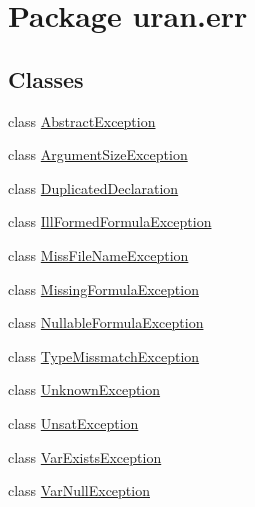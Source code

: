 \hypertarget{namespaceuran_1_1err}{}\section{Package uran.\+err}
\label{namespaceuran_1_1err}
\subsection*{Classes}
\begin{DoxyCompactItemize}
\item 
class \hyperlink{classuran_1_1err_1_1_abstract_exception}{Abstract\+Exception}
\item 
class \hyperlink{classuran_1_1err_1_1_argument_size_exception}{Argument\+Size\+Exception}
\item 
class \hyperlink{classuran_1_1err_1_1_duplicated_declaration}{Duplicated\+Declaration}
\item 
class \hyperlink{classuran_1_1err_1_1_ill_formed_formula_exception}{Ill\+Formed\+Formula\+Exception}
\item 
class \hyperlink{classuran_1_1err_1_1_miss_file_name_exception}{Miss\+File\+Name\+Exception}
\item 
class \hyperlink{classuran_1_1err_1_1_missing_formula_exception}{Missing\+Formula\+Exception}
\item 
class \hyperlink{classuran_1_1err_1_1_nullable_formula_exception}{Nullable\+Formula\+Exception}
\item 
class \hyperlink{classuran_1_1err_1_1_type_missmatch_exception}{Type\+Missmatch\+Exception}
\item 
class \hyperlink{classuran_1_1err_1_1_unknown_exception}{Unknown\+Exception}
\item 
class \hyperlink{classuran_1_1err_1_1_unsat_exception}{Unsat\+Exception}
\item 
class \hyperlink{classuran_1_1err_1_1_var_exists_exception}{Var\+Exists\+Exception}
\item 
class \hyperlink{classuran_1_1err_1_1_var_null_exception}{Var\+Null\+Exception}
\end{DoxyCompactItemize}
